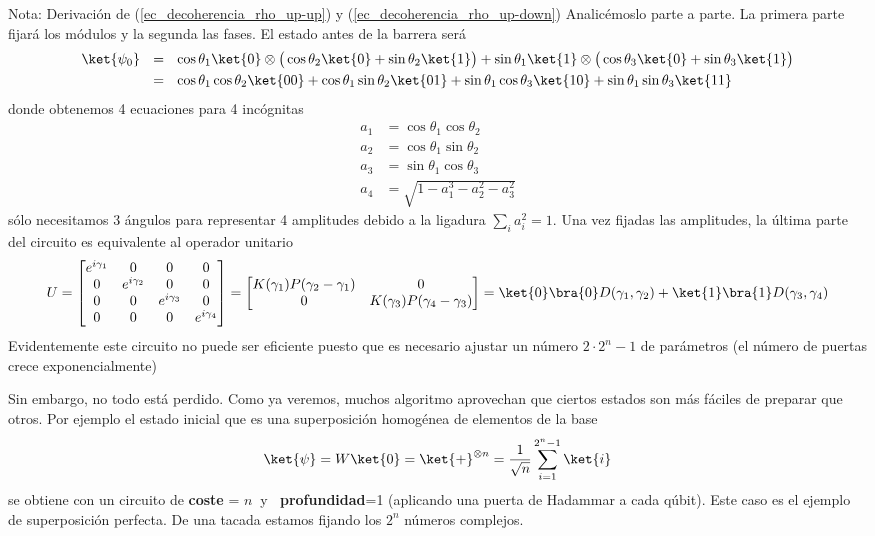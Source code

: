 \documentclass[a4paper,11pt]{book} %
\numberwithin{equation}{chapter}
\begin{document}
\begin{mybox_blue}{Nota: Derivación de (\ref{ec_decoherencia_rho_up-up}) y  (\ref{ec_decoherencia_rho_up-down})}
Analicémoslo parte a parte. La primera parte fijará los módulos y la segunda las fases. El estado antes de la barrera será
	\begin{align*}
	\ket{\psi_0}~~ 
	&= ~~ \cos\theta_1 \ket{0}\otimes \big( \cos\theta_2 \ket{0} + \sin\theta_2\ket{1}\big) 
		+ \sin\theta_1\ket{1}\otimes \big(\cos\theta_3\ket{0} + \sin\theta_3\ket{1}\big) \\
	&= ~~ \cos\theta_1 \cos\theta_2 \ket{00} + \cos\theta_1\sin\theta_2\ket{01} + \sin\theta_1\cos\theta_3\ket{10} 
		+ \sin\theta_1\sin\theta_3\ket{11} 
	\end{align*}
donde obtenemos 4 ecuaciones para 4 incógnitas
	\begin{align*}
	a_1 &=  \cos\theta_1 \cos\theta_2  \\
	a_2 &=  \cos\theta_1\sin\theta_2   \\
	a_3 &=  \sin\theta_1\cos\theta_3   \\
	a_4 &=  \sqrt{1-a_1^3-a_2^2-a_3^2}
	\end{align*}
sólo necesitamos 3 ángulos para representar 4 amplitudes debido a la ligadura $\sum_i a_i^2 = 1$.
Una vez fijadas las amplitudes, la última parte del circuito es equivalente al  operador unitario
	$$
	U = 
	\begin{bmatrix} 
		e^{i\gamma_1} & 0 & 0 & 0    \\ 
		0 & e^{i\gamma_2} & 0 & 0    \\ 
		0 & 0 & e^{i\gamma_3} & 0    \\ 
		0 & 0 & 0 & e^{i\gamma_4} 
	\end{bmatrix} = 
	\begin{bmatrix} 
		K(\gamma_1)P(\gamma_2-\gamma_1) & 0   \\  
		0 &K(\gamma_3) P(\gamma_4-\gamma_3) 
	\end{bmatrix}  
	= \ket{0}\bra{0}D(\gamma_1,\gamma_2) + \ket{1}\bra{1}D(\gamma_3,\gamma_4)  
	$$
Evidentemente este circuito no puede ser eficiente puesto que es necesario ajustar un número $2\cdot 2^n-1$ de parámetros (el número de puertas crece exponencialmente)

Sin embargo, no todo está perdido. Como ya veremos, muchos algoritmo aprovechan que ciertos estados son más fáciles de preparar que otros.  Por ejemplo el estado inicial que es una superposición homogénea de elementos de la base
$$
\ket{\psi} = W \ket{0}  = \ket{+}^{\otimes n}= \frac{1}{\sqrt{n}}\sum_{i=1}^{2^n-1} \ket{i}
$$
se obtiene con un circuito de  \textbf{coste} = $n~$  y $~$ \textbf{profundidad}=1 (aplicando una puerta de Hadammar a cada qúbit). Este caso es el ejemplo de superposición perfecta. De una tacada estamos fijando los $2^n$ números complejos.


\end{mybox_blue}
\end{document}
